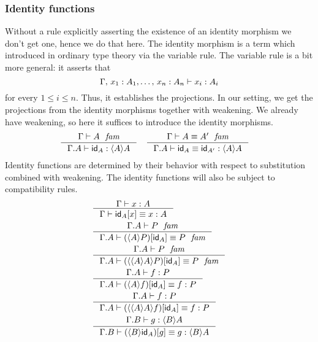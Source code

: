 \subsubsection{Identity functions}
Without a rule explicitly asserting the existence of an identity morphism we don't
get one, hence we do that here. The identity morphism is a term which introduced
in ordinary type theory via the variable rule. The variable rule is a bit more
general: it asserts that
\begin{equation*}
\jterm{\Gamma,\,x_1:A_1,\ldots,\,x_n:A_n}{A_i}{x_i}
\end{equation*}
for every $1\leq i\leq n$. Thus, it establishes the projections. In our setting,
we get the projections from the identity morphisms together with weakening. We
already have weakening, so here it suffices to introduce the identity morphisms.
\begin{align}
& \inference{\jfam{\Gamma}{A}}{\jterm{\ctxext{\Gamma}{A}}{\ctxwk{A}{A}}{\idfunc[A]}}
& & \inference{\jfameq{\Gamma}{A}{A'}}{\jtermeq{\ctxext{\Gamma}{A}}{\ctxwk{A}{A}}{\idfunc[A]}{\idfunc[A']}}
\end{align}
Identity functions are determined by their behavior with respect to substitution combined with
weakening. The identity functions will also be subject to compatibility rules.
\begin{align}
& \inference{\jterm{\Gamma}{A}{x}}{\jtermeq{\Gamma}{A}{\subst{x}{\idfunc[A]}}{x}}\label{idfunc-subst-defn}\\
& \inference{\jfam{\ctxext{\Gamma}{A}}{P}}{\jfameq{\ctxext{\Gamma}{A}}{\subst{\idfunc[A]}{\ctxwk{A}{P}}}{P}}\label{idfunc-wk-defn}\\
& \inference{\jfam{\ctxext{\Gamma}{A}}{P}}{\jfameq{\ctxext{\Gamma}{A}}{\subst{\idfunc[A]}{\ctxwk{{A}{A}}{P}}}{P}}\label{idfunc-wk-defn2}\\
& \inference{\jterm{\ctxext{\Gamma}{A}}{P}{f}}{\jtermeq{\ctxext{\Gamma}{A}}{P}{\subst{\idfunc[A]}{\ctxwk{A}{f}}}{f}}\label{idfunc-precomp} \\
& \inference{\jterm{\ctxext{\Gamma}{A}}{P}{f}}{\jtermeq{\ctxext{\Gamma}{A}}{P}{\subst{\idfunc[A]}{\ctxwk{{A}{A}}{f}}}{f}}\label{idfunc-precomp} \\
& \inference{\jterm{\ctxext{\Gamma}{B}}{\ctxwk{B}{A}}{g}}{\jtermeq{\ctxext{\Gamma}{B}}{\ctxwk{B}{A}}{\subst{g}{\ctxwk{B}{\idfunc[A]}}}{g}}\label{idfunc-postcomp}
\end{align}

